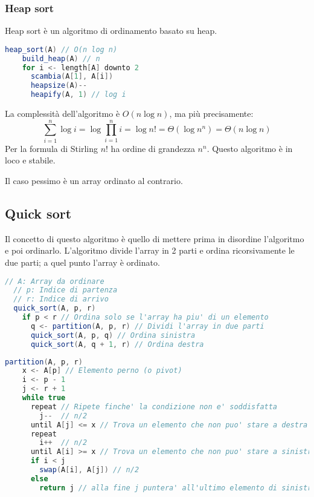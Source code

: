 \documentclass[a4paper]{article}
\begin{document}
\subsubsection{Heap sort}
Heap sort è un algoritmo di ordinamento basato su heap.
\begin{lstlisting}[language=Scala]
  heap_sort(A) // O(n log n)
    build_heap(A) // n
    for i <- length[A] downto 2
      scambia(A[1], A[i])
      heapsize(A)--
      heapify(A, 1) // log i
\end{lstlisting}


La complessità dell'algoritmo è \( O(n \log n) \), ma più precisamente:
\[
\sum_{i=1}^{n} \log i = \log \prod_{i=1}^{n} i = \log n! = \Theta(\log n^n) = \Theta(n \log n)
\] 
Per la formula di Stirling \( n! \) ha ordine di grandezza \( n^n \). Questo algoritmo
è in loco e stabile.

\vspace{1em}
\noindent
Il caso pessimo è un array ordinato al contrario.

\subsection{Quick sort}
Il concetto di questo algoritmo è quello di mettere prima in disordine l'algoritmo e poi
ordinarlo. L'algoritmo divide l'array in 2 parti e ordina ricorsivamente le due parti; a
quel punto l'array è ordinato.

\begin{lstlisting}[language=Scala]
  // A: Array da ordinare 
  // p: Indice di partenza
  // r: Indice di arrivo
  quick_sort(A, p, r)
    if p < r // Ordina solo se l'array ha piu' di un elemento
      q <- partition(A, p, r) // Dividi l'array in due parti
      quick_sort(A, p, q) // Ordina sinistra
      quick_sort(A, q + 1, r) // Ordina destra
\end{lstlisting}
\begin{lstlisting}[language=Scala]
  partition(A, p, r)
    x <- A[p] // Elemento perno (o pivot)
    i <- p - 1
    j <- r + 1
    while true
      repeat // Ripete finche' la condizione non e' soddisfatta
        j--  // n/2
      until A[j] <= x // Trova un elemento che non puo' stare a destra
      repeat
        i++  // n/2
      until A[i] >= x // Trova un elemento che non puo' stare a sinistra
      if i < j
        swap(A[i], A[j]) // n/2
      else
        return j // alla fine j puntera' all'ultimo elemento di sinistra
\end{lstlisting}
\end{document}
